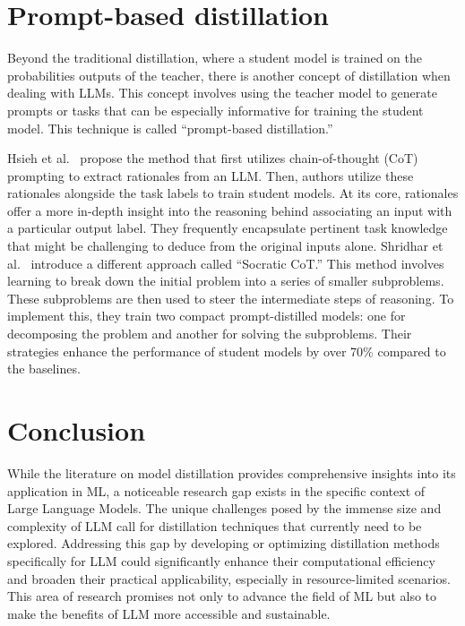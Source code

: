 \section{Prompt-based distillation}

Beyond the traditional distillation, where a student model is trained on the probabilities outputs of the teacher, there is another concept of distillation when dealing with LLMs. This concept involves using the teacher model to generate prompts or tasks that can be especially informative for training the student model. This technique is called “prompt-based distillation.”

Hsieh et al.\ \cite{stepbystep} propose the method that first utilizes chain-of-thought (CoT) \cite{cot} prompting to extract rationales from an LLM\@. Then, authors utilize these rationales alongside the task labels to train student models. At its core, rationales offer a more in-depth insight into the reasoning behind associating an input with a particular output label. They frequently encapsulate pertinent task knowledge that might be challenging to deduce from the original inputs alone. Shridhar et al.\ \cite{socraticcot} introduce a different approach called “Socratic CoT.” This method involves learning to break down the initial problem into a series of smaller subproblems. These subproblems are then used to steer the intermediate steps of reasoning. To implement this, they train two compact prompt-distilled models: one for decomposing the problem and another for solving the subproblems. Their strategies enhance the performance of student models by over 70\% compared to the baselines.

\section*{Conclusion}

While the literature on model distillation provides comprehensive insights into its application in ML, a noticeable research gap exists in the specific context of Large Language Models. The unique challenges posed by the immense size and complexity of LLM call for distillation techniques that currently need to be explored. Addressing this gap by developing or optimizing distillation methods specifically for LLM could significantly enhance their computational efficiency and broaden their practical applicability, especially in resource-limited scenarios. This area of research promises not only to advance the field of ML but also to make the benefits of LLM more accessible and sustainable.

